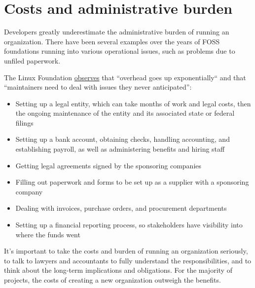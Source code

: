 


\chapter{Costs and administrative burden}

Developers greatly underestimate the administrative burden of running an organization.  There have been several examples over the years of FOSS foundations running into various operational issues, such as problems due to unfiled paperwork.

The Linux Foundation \href{https://www.linuxfoundation.org/blog/the-linux-foundation-its-not-just-the-linux-operating-system/}{observes} that ``overhead goes up exponentially`` and that ``maintainers need to deal with issues they never anticipated'':

\begin{itemize}

\itemsep 0.50em

\item Setting up a legal entity, which can take months of work and legal costs, then the ongoing maintenance of the entity and its associated state or federal filings

\item Setting up a bank account, obtaining checks, handling accounting, and establishing payroll, as well as administering benefits and hiring staff

\item Getting legal agreements signed by the sponsoring companies

\item Filling out paperwork and forms to be set up as a supplier with a sponsoring company

\item Dealing with invoices, purchase orders, and procurement departments

\item Setting up a financial reporting process, so stakeholders have visibility into where the funds went

\end{itemize}

It's important to take the costs and burden of running an organization seriously, to talk to lawyers and accountants to fully understand the responsibilities, and to think about the long-term implications and obligations.  For the majority of projects, the costs of creating a new organization outweigh the benefits.

